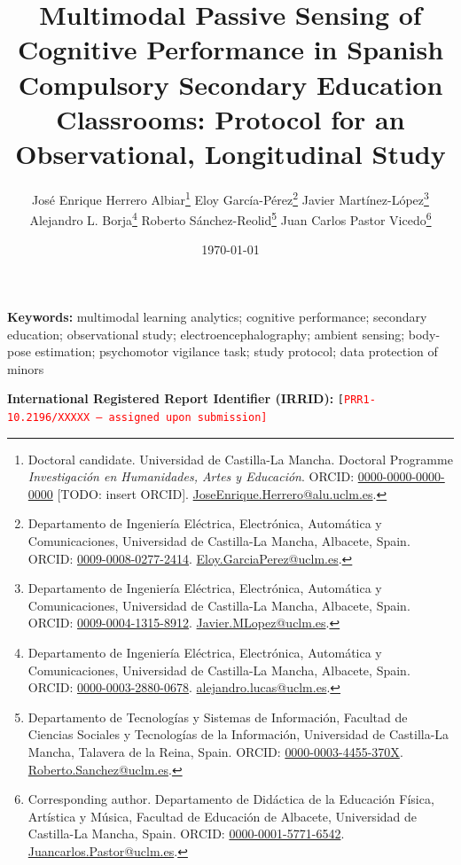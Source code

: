 \documentclass[12pt]{article}
\title{Multimodal Passive Sensing of Cognitive Performance in Spanish Compulsory Secondary Education Classrooms: Protocol for an Observational, Longitudinal Study}
\author{
José Enrique Herrero Albiar\thanks{Doctoral candidate. Universidad de Castilla-La Mancha. Doctoral Programme \emph{Investigación en Humanidades, Artes y Educación}. ORCID: \href{https://orcid.org/0000-0000-0000-0000}{0000-0000-0000-0000} [TODO: insert ORCID]. \href{mailto:JoseEnrique.Herrero@alu.uclm.es}{JoseEnrique.Herrero@alu.uclm.es}.} \quad
Eloy García-Pérez\thanks{Departamento de Ingeniería Eléctrica, Electrónica, Automática y Comunicaciones, Universidad de Castilla-La Mancha, Albacete, Spain. ORCID: \href{https://orcid.org/0009-0008-0277-2414}{0009-0008-0277-2414}. \href{mailto:Eloy.GarciaPerez@uclm.es}{Eloy.GarciaPerez@uclm.es}.} \quad
Javier Martínez-López\thanks{Departamento de Ingeniería Eléctrica, Electrónica, Automática y Comunicaciones, Universidad de Castilla-La Mancha, Albacete, Spain. ORCID: \href{https://orcid.org/0009-0004-1315-8912}{0009-0004-1315-8912}. \href{mailto:Javier.MLopez@uclm.es}{Javier.MLopez@uclm.es}.} \quad
Alejandro L. Borja\thanks{Departamento de Ingeniería Eléctrica, Electrónica, Automática y Comunicaciones, Universidad de Castilla-La Mancha, Albacete, Spain. ORCID: \href{https://orcid.org/0000-0003-2880-0678}{0000-0003-2880-0678}. \href{mailto:alejandro.lucas@uclm.es}{alejandro.lucas@uclm.es}.} \quad
Roberto Sánchez-Reolid\thanks{Departamento de Tecnologías y Sistemas de Información, Facultad de Ciencias Sociales y Tecnologías de la Información, Universidad de Castilla-La Mancha, Talavera de la Reina, Spain. ORCID: \href{https://orcid.org/0000-0003-4455-370X}{0000-0003-4455-370X}. \href{mailto:Roberto.Sanchez@uclm.es}{Roberto.Sanchez@uclm.es}.} \quad
Juan Carlos Pastor Vicedo\thanks{Corresponding author. Departamento de Didáctica de la Educación Física, Artística y Música, Facultad de Educación de Albacete, Universidad de Castilla-La Mancha, Spain. ORCID: \href{https://orcid.org/0000-0001-5771-6542}{0000-0001-5771-6542}. \href{mailto:Juancarlos.Pastor@uclm.es}{Juancarlos.Pastor@uclm.es}.}
}
\date{\today}
\begin{document}
\maketitle
\thispagestyle{empty}



\vspace{1em}
\noindent \textbf{Keywords:} multimodal learning analytics; cognitive performance; secondary education; observational study; electroencephalography; ambient sensing; body-pose estimation; psychomotor vigilance task; study protocol; data protection of minors

\vspace{0.5em}
\noindent \textbf{International Registered Report Identifier (IRRID):} \texttt{[\textcolor{red}{PRR1-10.2196/XXXXX --- assigned upon submission]}}

\newpage
\setcounter{page}{1}










\clearpage
\small \printbibliography
\end{document}
